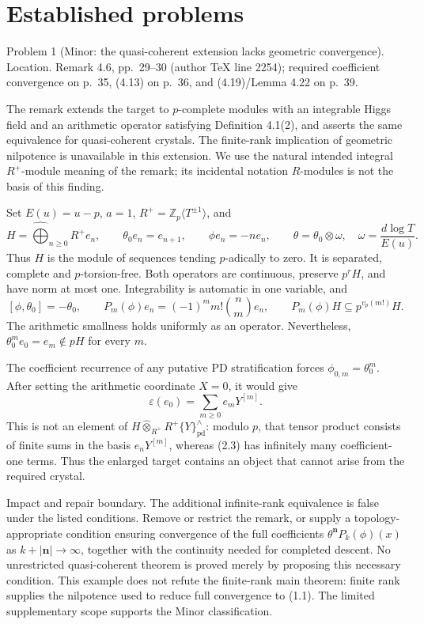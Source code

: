 \documentclass[10pt]{article}
\begin{document}
\section*{Established problems}
Problem 1 (Minor: the quasi-coherent extension lacks geometric convergence).  Location. Remark 4.6, pp. 29–30 (author TeX line 2254); required coefficient convergence on p. 35, (4.13) on p. 36, and (4.19)/Lemma 4.22 on p. 39.\par
The remark extends the target to \(p\)-complete modules with an integrable Higgs field and an arithmetic operator satisfying Definition 4.1(2), and asserts the same equivalence for quasi-coherent crystals. The finite-rank implication of geometric nilpotence is unavailable in this extension. We use the natural intended integral \(R^+\)-module meaning of the remark; its incidental notation \(R\)-modules is not the basis of this finding.\par
Set \(E(u)=u-p\), \(a=1\), \(R^+=\mathbb Z_p\langle T^{\pm1}\rangle\), and \[H=\widehat{\bigoplus}_{n\ge0}R^+e_n,\qquad
 \theta_0e_n=e_{n+1},\qquad \phi e_n=-ne_n,\qquad
 \theta=\theta_0\otimes\omega,\quad \omega=\frac{d\log T}{E(u)}.
 \tag{2.1}\] Thus \(H\) is the module of sequences tending \(p\)-adically to zero. It is separated, complete and \(p\)-torsion-free. Both operators are continuous, preserve \(p^rH\), and have norm at most one. Integrability is automatic in one variable, and \[[\phi,\theta_0]=-\theta_0,\qquad
 P_m(\phi)e_n=(-1)^m m!\binom nm e_n,\qquad
 P_m(\phi)H\subseteq p^{v_p(m!)}H.
 \tag{2.2}\] The arithmetic smallness holds uniformly as an operator. Nevertheless, \(\theta_0^m e_0=e_m\notin pH\) for every \(m\).\par
The coefficient recurrence of any putative PD stratification forces \(\phi_{0,m}=\theta_0^m\). After setting the arithmetic coordinate \(X=0\), it would give \[\varepsilon(e_0)=\sum_{m\ge0}e_mY^{[m]}.
 \tag{2.3}\] This is not an element of \(H\widehat\otimes_{R^+}R^+\{Y\}_{\mathrm{pd}}^\wedge\): modulo \(p\), that tensor product consists of finite sums in the basis \(e_nY^{[m]}\), whereas (2.3) has infinitely many coefficient-one terms. Thus the enlarged target contains an object that cannot arise from the required crystal.\par
Impact and repair boundary. The additional infinite-rank equivalence is false under the listed conditions. Remove or restrict the remark, or supply a topology-appropriate condition ensuring convergence of the full coefficients \(\theta^{\mathbf n}P_k(\phi)(x)\) as \(k+|\mathbf n|\to\infty\), together with the continuity needed for completed descent. No unrestricted quasi-coherent theorem is proved merely by proposing this necessary condition. This example does not refute the finite-rank main theorem: finite rank supplies the nilpotence used to reduce full convergence to (1.1). The limited supplementary scope supports the Minor classification.\par
\end{document}
